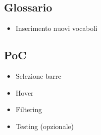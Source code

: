 \subsection{Glossario}
\begin{itemize}
    \item Inserimento nuovi vocaboli
\end{itemize}

\subsection{PoC}
\begin{itemize}
    \item Selezione barre
    \item Hover
    \item Filtering
    \item Testing (opzionale)
\end{itemize}

